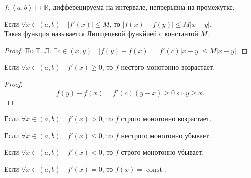 \documentclass[11pt, oneside]{article}   	%
\DeclareMathOperator{\const}{const}
\begin{document}
            $f: \left<a, b\right> \mapsto \mathbb{R}$, дифферецируема на интервале, непрерывна на промежутке.\\
            \begin{tlemma}
                Если $\forall{x\in \left( a, b \right) }\quad |f'(x)| \le  M$, то $|f(x)-f(y)| \le M|x-y|$.\\
                Такая функция называется Липщецевой функйией с константой $M$.
                \begin{proof}
                    По Т. Л. $\exists{c\in \left( x, y \right) }\quad |f(y)-f(x)| = f'(c)|x-y| \le M|x-y|$.
                \end{proof}
            \end{tlemma}
            \begin{tlemma}
                Если $\forall{x\in (a, b)}\quad f'(x) \ge 0$, то $f$ нестрго монотонно возрастает.\\
                \begin{proof}
                    \[ f(y) - f(x) = f'(c)(y-x) \ge  0 \iff y \ge  x .\] 
                \end{proof}
            \end{tlemma}
            \begin{tlemma}
                Если $\forall{x\in \left( a, b \right) }\quad f'(x) > 0$, то $f$ строго монотонно возрастает.
            \end{tlemma}
            \begin{tlemma}
                Если $\forall{x\in \left( a, b \right) }\quad f'(x) \le 0$, то $f$ нестрого монотонно убывает.
            \end{tlemma}
            \begin{tlemma}
                Если $\forall{x\in \left( a, b \right) }\quad f'(x) < 0$, то $f$ строго монотонно убывает.
            \end{tlemma}
            \begin{tlemma}
                Если $\forall{x\in \left( a, b \right) }\quad f'(x) = 0$, то $f(x) = \const$.
            \end{tlemma}
\end{document}
